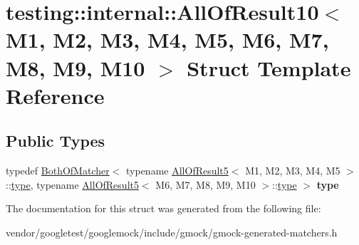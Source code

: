 \hypertarget{structtesting_1_1internal_1_1AllOfResult10}{}\section{testing\+:\+:internal\+:\+:All\+Of\+Result10$<$ M1, M2, M3, M4, M5, M6, M7, M8, M9, M10 $>$ Struct Template Reference}
\label{structtesting_1_1internal_1_1AllOfResult10}
\subsection*{Public Types}
\begin{DoxyCompactItemize}
\item 
typedef \hyperlink{classtesting_1_1internal_1_1BothOfMatcher}{Both\+Of\+Matcher}$<$ typename \hyperlink{structtesting_1_1internal_1_1AllOfResult5}{All\+Of\+Result5}$<$ M1, M2, M3, M4, M5 $>$\+::\hyperlink{classtesting_1_1internal_1_1BothOfMatcher}{type}, typename \hyperlink{structtesting_1_1internal_1_1AllOfResult5}{All\+Of\+Result5}$<$ M6, M7, M8, M9, M10 $>$\+::\hyperlink{classtesting_1_1internal_1_1BothOfMatcher}{type} $>$ {\bfseries type}\hypertarget{structtesting_1_1internal_1_1AllOfResult10_a48d6c6de6d0d5445b212119e1f536af5}{}\label{structtesting_1_1internal_1_1AllOfResult10_a48d6c6de6d0d5445b212119e1f536af5}

\end{DoxyCompactItemize}


The documentation for this struct was generated from the following file\+:\begin{DoxyCompactItemize}
\item 
vendor/googletest/googlemock/include/gmock/gmock-\/generated-\/matchers.\+h\end{DoxyCompactItemize}
